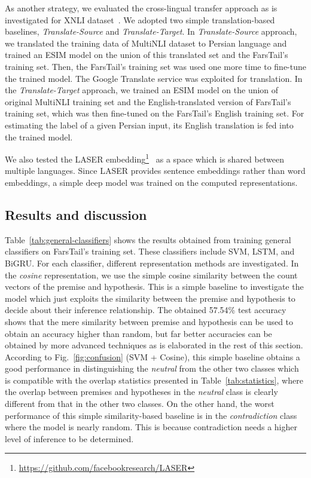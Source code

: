 \documentclass[preprint,12pt]{elsarticle}
\begin{document}
As another strategy, we evaluated the cross-lingual transfer approach as is investigated for XNLI dataset~\citep{conneau2018xnli}. We adopted two simple translation-based baselines, \textit{Translate-Source} and \textit{Translate-Target}. In \textit{Translate-Source} approach, we translated the training data of MultiNLI dataset to Persian language and trained an ESIM model on the union of this translated set and the FarsTail's training set. Then, the FarsTail's training set was used one more time to fine-tune the trained model. The Google Translate service was exploited for translation. In the \textit{Translate-Target} approach, we trained an ESIM model on the union of original MultiNLI training set and the English-translated version of FarsTail's training set, which was then fine-tuned on the FarsTail's English training set. For estimating the label of a given Persian input, its English translation is fed into the trained model. 

We also tested the LASER embedding\footnote{\url{https://github.com/facebookresearch/LASER}}~\citep{artetxe2019massively} as a space which is shared between multiple languages. Since LASER provides sentence embeddings rather than word embeddings, a simple deep model was trained on the computed representations. 



\subsection{Results and discussion}
\label{subsec:results}

Table~\ref{tab:general-classifiers} shows the results obtained from training general classifiers on FarsTail's training set. These classifiers include SVM, LSTM, and BiGRU. For each classifier, different representation methods are investigated. In the \textit{cosine} representation, we use the simple cosine similarity between the count vectors of the premise and hypothesis. This is a simple baseline to investigate the model which just exploits the similarity between the premise and hypothesis to decide about their inference relationship. The obtained 57.54\% test accuracy shows that the mere similarity between premise and hypothesis can be used to obtain an accuracy higher than random, but far better accuracies can be obtained by more advanced techniques as is elaborated in the rest of this section. According to Fig.~\ref{fig:confusion} (SVM + Cosine), this simple baseline obtains a good performance in distinguishing the \textit{neutral} from the other two classes which is compatible with the overlap statistics presented in Table~\ref{tab:statistics}, where the overlap between premises and hypotheses in the \textit{neutral} class is clearly different from that in the other two classes. On the other hand, the worst performance of this simple similarity-based baseline is in the \textit{contradiction} class where the model is nearly random. This is because contradiction needs a higher level of inference to be determined. 
\end{document}
